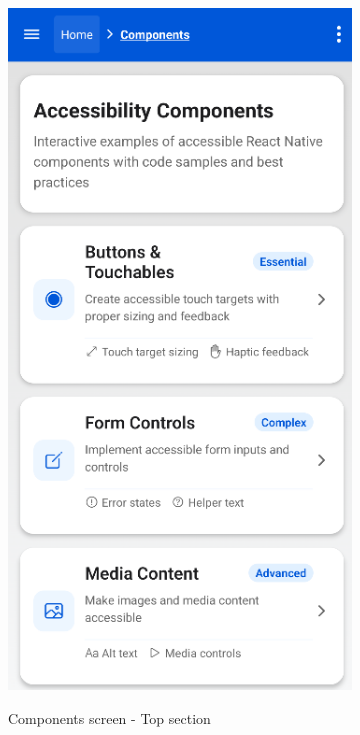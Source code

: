 \begin{figure}[ht]
\begin{subfigure}[b]{0.48\textwidth}
        \includegraphics[width=\linewidth, alt={First part of the Components Screen}]{img/components1.png}
        \caption{Components screen - Top section}
        \label{fig:components-top}
    \end{subfigure}
    \hfill
    \begin{subfigure}[b]{0.48\textwidth}

\end{subfigure}
\end{figure}
